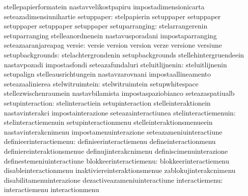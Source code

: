                                   stellepapierformatein            nastavvelikostpapiru
                                  impostadimensionicarta           seteazadimensiunihartie
setuppaper: stelpapierin  setuppaper
            setuppaper    setuppaper
            setuppaper    setuppaper
                  setuparranging: stelarrangerenin                 setuparranging
                                  stelleanordnenein                nastavusporadani
                                  impostaparranging                seteazaaranjareapag
                          versie: versie                           version
                                  version                          verze
                                  versione                         versiune
                setupbackgrounds: stelachtergrondenin              setupbackgrounds
                                  stellehintergruendeein           nastavpozadi
                                  impostasfondi                    seteazafundaluri
                 steluitlijnenin: steluitlijnenin                  setupalign
                                  stelleausrichtungein             nastavzarovnani
                                  impostaallineamento              seteazaalinierea
                 stelwitruimtein: stelwitruimtein                  setupwhitespace
                                  stellezwischenraumein            nastavbilamista
                                  impostaspaziobianco              seteazaspatiualb
                setupinteraction: stelinteractiein                 setupinteraction
                                  stelleinteraktionein             nastavinterakci
                                  impostainterazione               seteazainteractiunea
            stelinteractiemenuin: stelinteractiemenuin             setupinteractionmenu
                                  stelleinteraktionsmenueein       nastavinterakcnimenu
                                  impostamenuinterazione           seteazameniuinteractiune
         definieerinteractiemenu: definieerinteractiemenu          defineinteractionmenu
                                  definiereinteraktionsmenue       definujinterakcnimenu
                                  definiscimenuinterazione         definestemeniuinteractiune
          blokkeerinteractiemenu: blokkeerinteractiemenu           disableinteractionmenu
                                  inaktiviereinteraktionsmenue     zablokujinterakcnimenu
                                  disabilitamenuinterazione        dezactiveazameniuinteractiune
                  interactiemenu: interactiemenu                   interactionmenu
